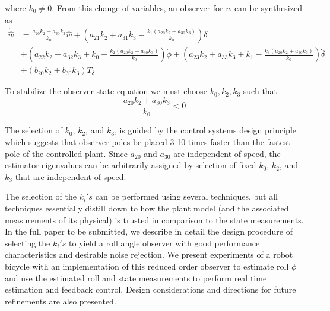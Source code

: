\documentclass[letterpaper,11pt]{article}
\begin{document}
where $k_0\ne0$.  From this change of variables, an observer for $w$ can be
synthesized as
\begin{align*}
\dot{\hat{w}} &= \frac{a_{20} k_{2} + a_{30} k_{3}}{k_{0}} \hat{w}
 + \left(a_{21} k_{2} + a_{31} k_{3} - \frac{k_{1} \left(a_{20} k_{2} + a_{30} k_{3}\right)}{k_{0}}\right) \delta \\
 &+ \left(a_{22} k_{2} + a_{32} k_{3} + k_{0} - \frac{k_{2} \left(a_{20} k_{2} + a_{30} k_{3}\right)}{k_{0}}\right) \dot{\phi}
 + \left(a_{23} k_{2} + a_{33} k_{3} + k_{1} - \frac{k_{3} \left(a_{20} k_{2} + a_{30} k_{3}\right)}{k_{0}}\right) \dot{\delta} \\
 &+ \left(b_{20} k_{2} + b_{30} k_{3}\right) T_\delta
\end{align*}

To stabilize the observer state equation we must choose $k_0, k_2, k_3$ such
that
\begin{equation*}
\frac{a_{20} k_{2} + a_{30} k_{3}}{k_{0}} < 0
\end{equation*}

The selection of $k_0$, $k_2$, and $k_3$, is guided by the control systems
design principle which suggests that observer poles be placed 3-10 times faster
than the fastest pole of the controlled plant. Since $a_{20}$ and $a_{30}$ are
independent of speed, the estimator eigenvalues can be arbitrarily assigned by
selection of fixed $k_0$, $k_2$, and $k_3$ that are independent of speed.

The selection of the $k_i's$ can be performed using several techniques, but all
techniques essentially distill down to how the plant model (and the associated
measurements of its physical) is trusted in comparison to the state
measurements. In the full paper to be submitted, we describe in detail the
design procedure of selecting the $k_i's$ to yield a roll angle observer with
good performance characteristics and desirable noise rejection.  We present
experiments of a robot bicycle with an implementation of this reduced order
observer to estimate roll $\phi$ and use the estimated roll and state
measurements to perform real time estimation and feedback control. Design
considerations and directions for future refinements are also presented.

\end{document}
